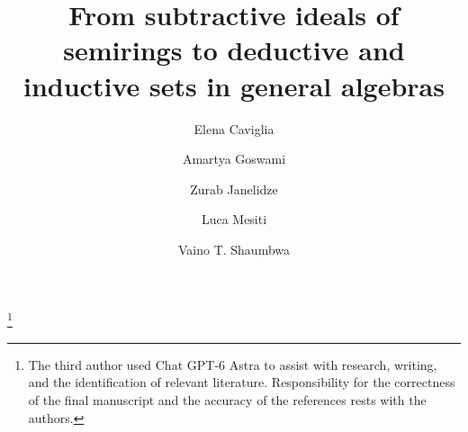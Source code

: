 \documentclass[12pt,english]{amsart}
\theoremstyle{definition}
\numberwithin{equation}{section}
\theoremstyle{remark}
\begin{document}
	
\title[From subtractive ideals of semirings to deductive and inductive sets in general algebras]{From subtractive ideals of semirings to deductive and inductive sets in general algebras}
	
\author{Elena Caviglia}
	
\address{National Institute for Theoretical and Computational Sciences, South Africa}

\author{Amartya Goswami}
\address{[1] Department of Mathematics and Applied Mathematics, University of Johannesburg, South Africa; [2] National Institute for Theoretical and Computational Sciences}

\author{Zurab Janelidze }
\address{[1] Mathematics Division, Department of Mathematical Sciences, Stellenbosch University, Private Bag
X1, Matieland, 7602 Stellenbosch, Western Cape, South Africa; [2] National Institute for Theoretical and Computational Sciences}

\author{ Luca Mesiti}
\address{Mathematics Division, Department of Mathematical Sciences, Stellenbosch University, Private Bag
X1, Matieland, 7602 Stellenbosch, Western Cape, South Africa}
	
\author{Vaino T. Shaumbwa}
\address{Department of Computing, Mathematical, and Statistical Sciences,
University of Namibia,
Private Bag 13301,
Windhoek,
Namibia}
	
    
\thanks{The third author used Chat GPT-6 Astra to assist with research, writing, and the identification of relevant literature. Responsibility for the correctness of the final manuscript and the accuracy of the references rests with the authors.}
	
\end{document}
